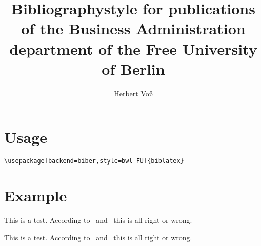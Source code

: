 \documentclass{article}
\title{Bibliographystyle for publications of the Business Administration department of the\newline
Free University of Berlin}
\author{Herbert Voß}
\begin{document}
\maketitle

\section{Usage}
\begin{verbatim}
\usepackage[backend=biber,style=bwl-FU]{biblatex}
\end{verbatim}

\section{Example}
This is a test. According to~\cite{Weisbrod:1964,Heal:1998} and~\cite{Wunder:2008} this is all 
right or wrong.

This is a test. According to~\parencite{Weisbrod:1964} and~\parencite{Wunder:2008} this is all 
right or wrong.




\printbibliography
\end{document}
